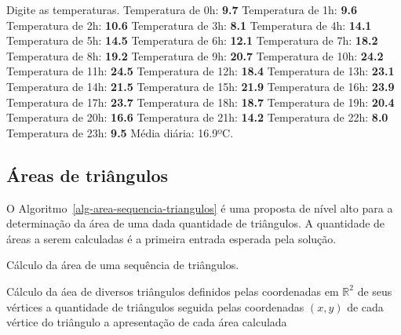 \documentclass[
  11pt,
  a4paper,
]{scrbook}
\newenvironment{Shaded}{\begin{snugshade}}{\end{snugshade}}
\newcommand{\KeywordTok}[1]{\textcolor[rgb]{0.13,0.29,0.53}{\textbf{#1}}}
\newcommand{\NormalTok}[1]{#1}
\begin{document}
\begin{Shaded}
\begin{Highlighting}[]
\NormalTok{Digite as temperaturas.}
\NormalTok{Temperatura de  0h: }\KeywordTok{ 9.7 }
\NormalTok{Temperatura de  1h: }\KeywordTok{ 9.6 }
\NormalTok{Temperatura de  2h: }\KeywordTok{ 10.6 }
\NormalTok{Temperatura de  3h: }\KeywordTok{ 8.1 }
\NormalTok{Temperatura de  4h: }\KeywordTok{ 14.1 }
\NormalTok{Temperatura de  5h: }\KeywordTok{ 14.5 }
\NormalTok{Temperatura de  6h: }\KeywordTok{ 12.1 }
\NormalTok{Temperatura de  7h: }\KeywordTok{ 18.2 }
\NormalTok{Temperatura de  8h: }\KeywordTok{ 19.2 }
\NormalTok{Temperatura de  9h: }\KeywordTok{ 20.7 }
\NormalTok{Temperatura de 10h: }\KeywordTok{ 24.2 }
\NormalTok{Temperatura de 11h: }\KeywordTok{ 24.5 }
\NormalTok{Temperatura de 12h: }\KeywordTok{ 18.4 }
\NormalTok{Temperatura de 13h: }\KeywordTok{ 23.1 }
\NormalTok{Temperatura de 14h: }\KeywordTok{ 21.5 }
\NormalTok{Temperatura de 15h: }\KeywordTok{ 21.9 }
\NormalTok{Temperatura de 16h: }\KeywordTok{ 23.9 }
\NormalTok{Temperatura de 17h: }\KeywordTok{ 23.7 }
\NormalTok{Temperatura de 18h: }\KeywordTok{ 18.7 }
\NormalTok{Temperatura de 19h: }\KeywordTok{ 20.4 }
\NormalTok{Temperatura de 20h: }\KeywordTok{ 16.6 }
\NormalTok{Temperatura de 21h: }\KeywordTok{ 14.2 }
\NormalTok{Temperatura de 22h: }\KeywordTok{ 8.0 }
\NormalTok{Temperatura de 23h: }\KeywordTok{ 9.5 }
\NormalTok{Média diária: 16.9ºC.}
\end{Highlighting}
\end{Shaded}

\subsection{Áreas de triângulos}\label{uxe1reas-de-triuxe2ngulos}

O Algoritmo~\ref{alg-area-sequencia-triangulos} é uma proposta de nível
alto para a determinação da área de uma dada quantidade de triângulos. A
quantidade de áreas a serem calculadas é a primeira entrada esperada
pela solução.

\begin{algorithm}[H]
\caption{\label{alg-area-sequencia-triangulos}Cálculo da área de uma
sequência de triângulos.}
\begingroup%


\begin{algorithmic}
    \Description Cálculo da áea de diversos triângulos definidos pelas coordenadas em $\mathbb{R}^2$ de seus vértices
    \Require a quantidade de triângulos seguida pelas coordenadas $(x,y)$ de cada vértice do triângulo
    \Ensure a apresentação de cada área calculada
    \Statex{}
    \EndFor
\end{algorithmic}

\endgroup
\end{algorithm}
\end{document}
